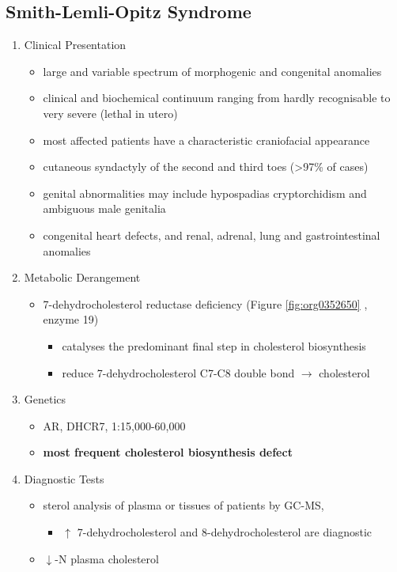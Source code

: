 \documentclass{scrartcl}
\begin{document}
\subsection{Smith-Lemli-Opitz Syndrome}
\label{sec:org7afeec3}
\begin{enumerate}
\item Clinical Presentation
\label{sec:org2d0a191}
\begin{itemize}
\item large and variable spectrum of morphogenic and congenital anomalies
\item clinical and biochemical continuum ranging from hardly recognisable
to very severe (lethal in utero)
\item most affected patients have a characteristic craniofacial appearance
\item cutaneous syndactyly of the second and third toes (>97\% of cases)
\item genital abnormalities may include hypospadias cryptorchidism and
ambiguous male genitalia
\item congenital heart defects, and renal, adrenal, lung and
gastrointestinal anomalies
\end{itemize}

\item Metabolic Derangement
\label{sec:org30670c2}
\begin{itemize}
\item 7-dehydrocholesterol reductase deficiency (Figure \ref{fig:org0352650} , enzyme 19)
\begin{itemize}
\item catalyses the predominant final step in cholesterol biosynthesis
\item reduce 7-dehydrocholesterol C7-C8 double bond \(\to\) cholesterol
\end{itemize}
\end{itemize}

\item Genetics
\label{sec:org1d3b116}
\begin{itemize}
\item AR, DHCR7, 1:15,000-60,000
\item \textbf{most frequent cholesterol biosynthesis defect}
\end{itemize}

\item Diagnostic Tests
\label{sec:org0ce3ce0}
\begin{itemize}
\item sterol analysis of plasma or tissues of patients by GC-MS,
\begin{itemize}
\item \(\uparrow\) 7-dehydrocholesterol and 8-dehydrocholesterol are diagnostic
\end{itemize}
\item \(\downarrow\)-N plasma cholesterol
\end{itemize}


\end{enumerate}
\end{document}

